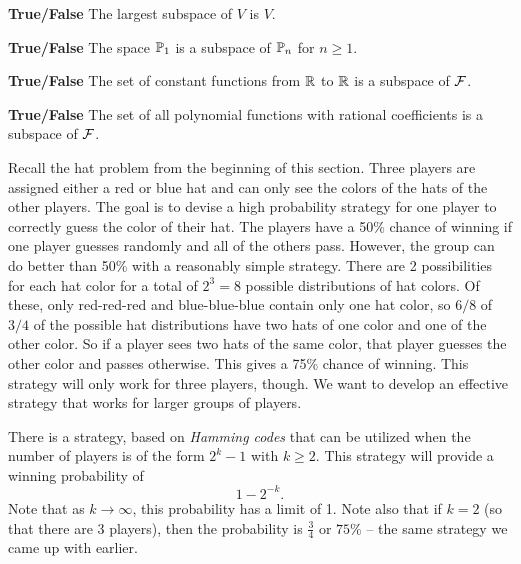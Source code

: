 \item \textbf{True/False} The largest subspace of $V$ is $V$.

\item \textbf{True/False} The space $\mathbb{P}_1$ is a subspace of $\mathbb{P}_n$ for $n \geq 1$.



\item \textbf{True/False} The set of constant functions from $\mathbb{R}$ to $\mathbb{R}$ is a subspace of $\mathcal{F}$.

\item \textbf{True/False} The set of all polynomial functions with rational coefficients is a subspace of $\mathcal{F}$.

\ea	
	
\ee


Recall the hat problem from the beginning of this section. Three players are assigned either a red or blue hat and can only see the colors of the hats of the other players. The goal is to devise a high probability strategy for one player to correctly guess the color of their hat. The players have a 50\% chance of winning if one player guesses randomly and all of the others pass. However, the group can do better than 50\% with a reasonably simple strategy. There are 2 possibilities for each hat color for a total of $2^3 = 8$ possible distributions of hat colors. Of these, only red-red-red and blue-blue-blue contain only one hat color, so $6/8$ of $3/4$ of the possible hat distributions have two hats of one color and one of the other color. So if a player sees two hats of the same color, that player guesses the other color and passes otherwise. This gives a 75\% chance of winning. This strategy will only work for three players, though. We want to develop an effective strategy that works for larger groups of players. 

There is a strategy, based on \emph{Hamming codes} that can be utilized when the number of players is of the form $2^k-1$ with $k \geq 2$. This strategy will provide a winning probability of
\[1 - 2^{-k}.\]
Note that as $k \to \infty$, this probability has a limit of 1. Note also that if $k=2$ (so that there are 3 players), then the probability is $\frac{3}{4}$ or $75\%$ -- the same strategy we came up with earlier. 

